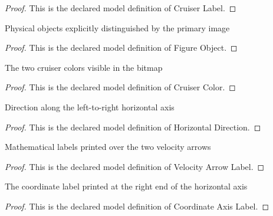 \begin{proof}
  This is the declared model definition of Cruiser Label.
\end{proof}
\begin{definition}
  \label{def:physics:phyx-mini-0589:phyxminiproblems-problemphyxmini0589-figureobject}
  Physical objects explicitly distinguished by the primary image
\end{definition}
\begin{proof}
  This is the declared model definition of Figure Object.
\end{proof}
\begin{definition}
  \label{def:physics:phyx-mini-0589:phyxminiproblems-problemphyxmini0589-cruisercolor}
  The two cruiser colors visible in the bitmap
\end{definition}
\begin{proof}
  This is the declared model definition of Cruiser Color.
\end{proof}
\begin{definition}
  \label{def:physics:phyx-mini-0589:phyxminiproblems-problemphyxmini0589-horizontaldirection}
  Direction along the left-to-right horizontal axis
\end{definition}
\begin{proof}
  This is the declared model definition of Horizontal Direction.
\end{proof}
\begin{definition}
  \label{def:physics:phyx-mini-0589:phyxminiproblems-problemphyxmini0589-velocityarrowlabel}
  Mathematical labels printed over the two velocity arrows
\end{definition}
\begin{proof}
  This is the declared model definition of Velocity Arrow Label.
\end{proof}
\begin{definition}
  \label{def:physics:phyx-mini-0589:phyxminiproblems-problemphyxmini0589-coordinateaxislabel}
  The coordinate label printed at the right end of the horizontal axis
\end{definition}
\begin{proof}
  This is the declared model definition of Coordinate Axis Label.
\end{proof}
